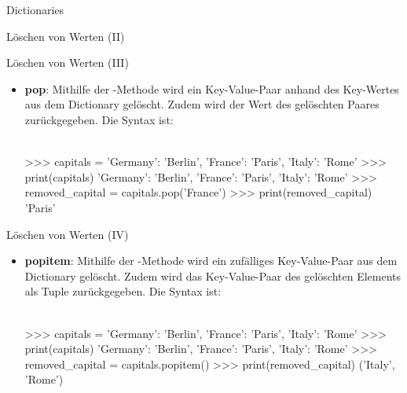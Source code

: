 \begin{subsection}{Dictionaries}
\begin{frame}[fragile]{Löschen von Werten (II)}
        \end{frame}
        
        \begin{frame}[fragile]{Löschen von Werten (III)}
        
            \begin{itemize}
                \item \textbf{pop}: Mithilfe der -Methode wird ein Key-Value-Paar anhand des Key-Wertes aus dem Dictionary gelöscht. Zudem wird der Wert des gelöschten Paares zurückgegeben. Die Syntax ist: \\~\
                
                
\begin{pyconcode}
>>> capitals = {'Germany': 'Berlin', 'France': 'Paris', 'Italy': 'Rome'}
>>> print(capitals)
{'Germany': 'Berlin', 'France': 'Paris', 'Italy': 'Rome'}
>>> removed_capital = capitals.pop('France')
>>> print(removed_capital)
'Paris'
\end{pyconcode}  
            \end{itemize}
                
        \end{frame}
        
        \begin{frame}[fragile]{Löschen von Werten (IV)}
        
            \begin{itemize}
                \item \textbf{popitem}: Mithilfe der -Methode wird ein zufälliges Key-Value-Paar aus dem Dictionary gelöscht. Zudem wird das Key-Value-Paar des gelöschten Elements als Tuple zurückgegeben. Die Syntax ist: \\~\
                
                
\begin{pyconcode}
>>> capitals = {'Germany': 'Berlin', 'France': 'Paris', 'Italy': 'Rome'}
>>> print(capitals)
{'Germany': 'Berlin', 'France': 'Paris', 'Italy': 'Rome'}
>>> removed_capital = capitals.popitem()
>>> print(removed_capital)
('Italy', 'Rome')
\end{pyconcode}  
            \end{itemize}
                
        \end{frame}
        

\end{subsection}

